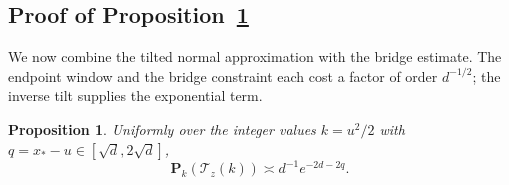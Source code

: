 \documentclass[11pt,a4paper]{article}
\numberwithin{equation}{section}
\newtheorem{proposition}[theorem]{Proposition}
\theoremstyle{remark}
\begin{document}
\subsection{Proof of Proposition~\ref{prop:terminalprob}}\label{sec:onepoint}\label{sec:terminalprob}
We now combine the tilted normal approximation with the bridge estimate. The endpoint window and the bridge constraint each cost a factor of order $d^{-1/2}$; the inverse tilt supplies the exponential term.
\begin{proposition}\label{prop:terminalprob}
Uniformly over the integer values $k=u^2/2$ with $q=x_*-u\in[\sqrt d,2\sqrt d]$,
\begin{equation}\label{eq:7.18}
\mathbf P_k(\mathcal T_z(k))\asymp d^{-1}e^{-2d-2q}.
\end{equation}
\end{proposition}
\end{document}
